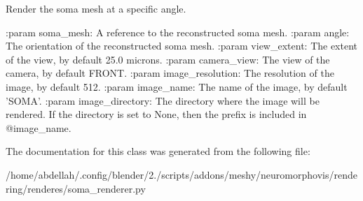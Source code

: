 \begin{DoxyVerb}Render the soma mesh at a specific angle.

:param soma_mesh:
    A reference to the reconstructed soma mesh.
:param angle:
    The orientation of the reconstructed soma mesh.
:param view_extent:
    The extent of the view, by default 25.0 microns.
:param camera_view:
    The view of the camera, by default FRONT.
:param image_resolution:
    The resolution of the image, by default 512.
:param image_name:
    The name of the image, by default 'SOMA'.
:param image_directory:
    The directory where the image will be rendered. If the directory is set to None,
    then the prefix is included in @image_name.
\end{DoxyVerb}
 

The documentation for this class was generated from the following file\+:\begin{DoxyCompactItemize}
\item 
/home/abdellah/.\+config/blender/2./scripts/addons/meshy/neuromorphovis/rendering/renderes/soma\+\_\+renderer.\+py\end{DoxyCompactItemize}
